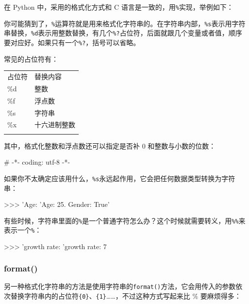 在 Python 中，采用的格式化方式和 C
语言是一致的，用\texttt{\%}实现，举例如下：


你可能猜到了，\texttt{\%}运算符就是用来格式化字符串的。在字符串内部，\texttt{\%s}表示用字符串替换，\texttt{\%d}表示用整数替换，有几个\texttt{\%?}占位符，后面就跟几个变量或者值，顺序要对应好。如果只有一个\texttt{\%?}，括号可以省略。

常见的占位符有：

\begin{longtable}[]{@{}ll@{}}
\toprule
占位符 & 替换内容 \\ \addlinespace
\midrule
\endhead
\%d & 整数 \\ \addlinespace
\%f & 浮点数 \\ \addlinespace
\%s & 字符串 \\ \addlinespace
\%x & 十六进制整数 \\ \addlinespace
\bottomrule
\end{longtable}

其中，格式化整数和浮点数还可以指定是否补 0 和整数与小数的位数：

\begin{pythoncode}
# -*- coding: utf-8 -*-
\end{pythoncode}

如果你不太确定应该用什么，\texttt{\%s}永远起作用，它会把任何数据类型转换为字符串：

\begin{pythoncode}
>>> 'Age: %
'Age: 25. Gender: True'
\end{pythoncode}

有些时候，字符串里面的\texttt{\%}是一个普通字符怎么办？这个时候就需要转义，用\texttt{\%\%}来表示一个\texttt{\%}：

\begin{pythoncode}
>>> 'growth rate: %
'growth rate: 7 %
\end{pythoncode}

\hypertarget{format}{%
\subsubsection{format()}\label{format}}

另一种格式化字符串的方法是使用字符串的\texttt{format()}方法，它会用传入的参数依次替换字符串内的占位符\texttt{\{0\}}、\texttt{\{1\}}\ldots\ldots，不过这种方式写起来比
\% 要麻烦得多：

